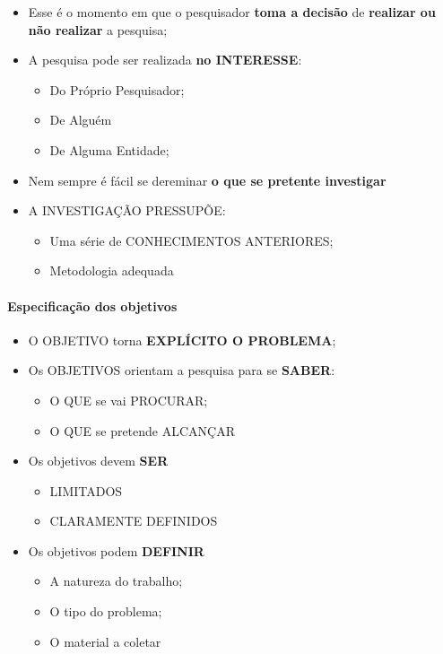 \documentclass[
]{book}
\providecommand{\tightlist}{%
  \setlength{\itemsep}{0pt}\setlength{\parskip}{0pt}}
\begin{document}
\begin{itemize}
\tightlist
\item
  Esse é o momento em que o pesquisador \textbf{toma a decisão} de \textbf{realizar ou não realizar} a pesquisa;
\item
  A pesquisa pode ser realizada \textbf{no INTERESSE}:

  \begin{itemize}
  \tightlist
  \item
    Do Próprio Pesquisador;
  \item
    De Alguém
  \item
    De Alguma Entidade;
  \end{itemize}
\item
  Nem sempre é fácil se dereminar \textbf{o que se pretente investigar}
\item
  A INVESTIGAÇÃO PRESSUPÕE:

  \begin{itemize}
  \tightlist
  \item
    Uma série de CONHECIMENTOS ANTERIORES;
  \item
    Metodologia adequada
  \end{itemize}
\end{itemize}

\hypertarget{especificauxe7uxe3o-dos-objetivos}{%
\paragraph{Especificação dos objetivos}\label{especificauxe7uxe3o-dos-objetivos}}

\begin{itemize}
\tightlist
\item
  O OBJETIVO torna \textbf{EXPLÍCITO O PROBLEMA};
\item
  Os OBJETIVOS orientam a pesquisa para se \textbf{SABER}:

  \begin{itemize}
  \tightlist
  \item
    O QUE se vai PROCURAR;
  \item
    O QUE se pretende ALCANÇAR
  \end{itemize}
\item
  Os objetivos devem \textbf{SER}

  \begin{itemize}
  \tightlist
  \item
    LIMITADOS
  \item
    CLARAMENTE DEFINIDOS
  \end{itemize}
\item
  Os objetivos podem \textbf{DEFINIR}

  \begin{itemize}
  \tightlist
  \item
    A natureza do trabalho;
  \item
    O tipo do problema;
  \item
    O material a coletar
  \end{itemize}
\end{itemize}
\end{document}
